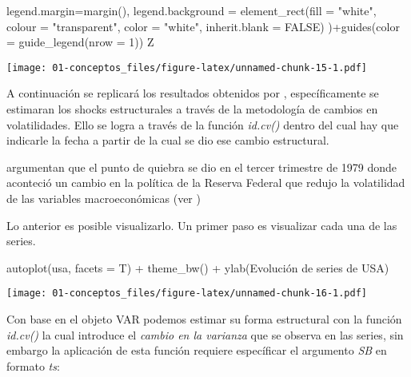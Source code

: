 \documentclass[
]{book}
\newenvironment{Shaded}{\begin{snugshade}}{\end{snugshade}}
\newcommand{\AttributeTok}[1]{\textcolor[rgb]{0.77,0.63,0.00}{#1}}
\newcommand{\ConstantTok}[1]{\textcolor[rgb]{0.00,0.00,0.00}{#1}}
\newcommand{\DecValTok}[1]{\textcolor[rgb]{0.00,0.00,0.81}{#1}}
\newcommand{\FunctionTok}[1]{\textcolor[rgb]{0.00,0.00,0.00}{#1}}
\newcommand{\NormalTok}[1]{#1}
\newcommand{\SpecialCharTok}[1]{\textcolor[rgb]{0.00,0.00,0.00}{#1}}
\newcommand{\StringTok}[1]{\textcolor[rgb]{0.31,0.60,0.02}{#1}}
\begin{document}
\begin{Shaded}
\begin{Highlighting}[]
  \AttributeTok{legend.margin=}\FunctionTok{margin}\NormalTok{(),}
  \AttributeTok{legend.background =} \FunctionTok{element\_rect}\NormalTok{(}\AttributeTok{fill =} \StringTok{"white"}\NormalTok{, }\AttributeTok{colour =} \StringTok{"transparent"}\NormalTok{,}
                                   \AttributeTok{color =} \StringTok{"white"}\NormalTok{, }\AttributeTok{inherit.blank =} \ConstantTok{FALSE}\NormalTok{)}
\NormalTok{)}\SpecialCharTok{+}\FunctionTok{guides}\NormalTok{(}\AttributeTok{color =} \FunctionTok{guide\_legend}\NormalTok{(}\AttributeTok{nrow =} \DecValTok{1}\NormalTok{))}
\NormalTok{Z}
\end{Highlighting}
\end{Shaded}

\texttt{[image: 01-conceptos\_files/figure-latex/unnamed-chunk-15-1.pdf]}

A continuación se replicará los resultados obtenidos por \citet{Herwartz2016}, específicamente se estimaran los shocks estructurales a través de la metodología de cambios en volatilidades. Ello se logra a través de la función \emph{id.cv()} dentro del cual hay que indicarle la fecha a partir de la cual se dio ese cambio estructural.

\citet{Herwartz2016} argumentan que el punto de quiebra se dio en el tercer trimestre de 1979 donde aconteció un cambio en la política de la Reserva Federal que redujo la volatilidad de las variables macroeconómicas (ver \citet{Stock2003})

Lo anterior es posible visualizarlo.
Un primer paso es visualizar cada una de las series.

\begin{Shaded}
\begin{Highlighting}[]
\FunctionTok{autoplot}\NormalTok{(usa, }\AttributeTok{facets =}\NormalTok{ T) }\SpecialCharTok{+} \FunctionTok{theme\_bw}\NormalTok{() }\SpecialCharTok{+} \FunctionTok{ylab}\NormalTok{(}\StringTok{\textquotesingle{}Evolución de series de USA\textquotesingle{}}\NormalTok{)}
\end{Highlighting}
\end{Shaded}

\texttt{[image: 01-conceptos\_files/figure-latex/unnamed-chunk-16-1.pdf]}

Con base en el objeto VAR podemos estimar su forma estructural con la función \emph{id.cv()} la cual introduce el \emph{cambio en la varianza} que se observa en las series, sin embargo la aplicación de esta función requiere específicar el argumento \emph{SB} en formato \emph{ts}:
\end{document}
